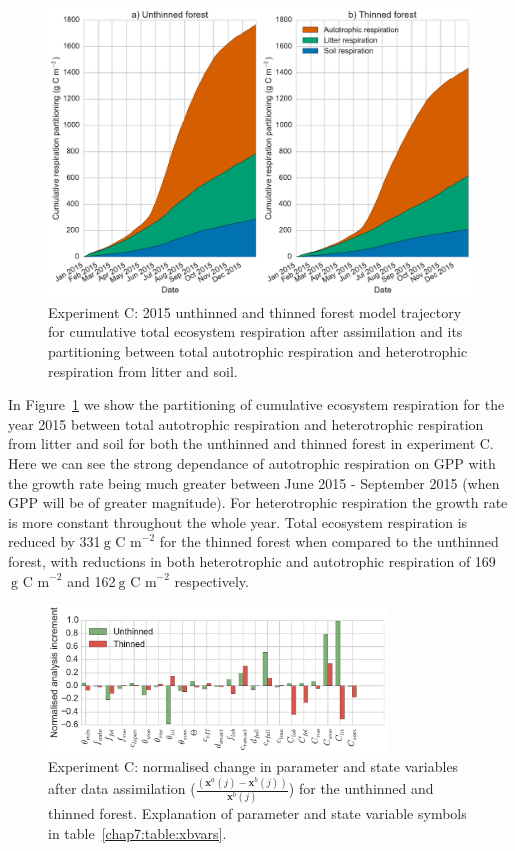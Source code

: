 \begin{figure}[ht]
    \centering
        \includegraphics[width=\textwidth]{chapter/chapter7/resp_partc.pdf}
    \caption{Experiment C: 2015 unthinned and thinned forest model trajectory for cumulative total ecosystem respiration after assimilation and its partitioning between total autotrophic respiration and heterotrophic respiration from litter and soil.} \label{chap7:fig:rt_part}
\end{figure}

In Figure~\ref{chap7:fig:rt_part} we show the partitioning of cumulative ecosystem respiration for the year 2015 between total autotrophic respiration and heterotrophic respiration from litter and soil for both the unthinned and thinned forest in experiment C. Here we can see the strong dependance of autotrophic respiration on GPP with the growth rate being much greater between June 2015 - September 2015 (when GPP will be of greater magnitude). For heterotrophic respiration the growth rate is more constant throughout the whole year. Total ecosystem respiration is reduced by 331\(~\text{g C m}^{-2}\) for the thinned forest when compared to the unthinned forest, with reductions in both heterotrophic and autotrophic respiration of 169\(~\text{g C m}^{-2}\) and 162\(~\text{g C m}^{-2}\) respectively.    

\begin{figure}[ht]
    \centering
    \includegraphics[width=0.8\textwidth]{chapter/chapter7/xa_incc.pdf}
    \caption{Experiment C: normalised change in parameter and state variables after data assimilation \big($\frac{(\textbf{x}^a(j) - \textbf{x}^b(j))}{\textbf{x}^b(j)}$\big) for the unthinned and thinned forest. Explanation of parameter and state variable symbols in table~\ref{chap7:table:xbvars}.}
    \label{chap7:fig:xa_inc}
\end{figure}

